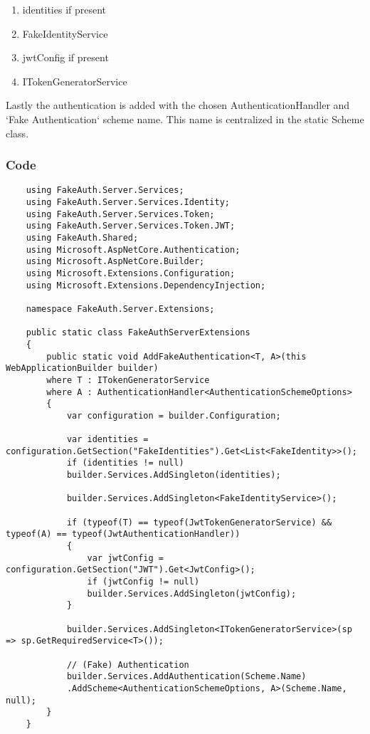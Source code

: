 \begin{enumerate}
    \item identities if present
    \item FakeIdentityService
    \item jwtConfig if present
    \item ITokenGeneratorService
\end{enumerate}

Lastly the authentication is added with the chosen AuthenticationHandler and `Fake Authentication` scheme name. This name is centralized in the static Scheme class.

\subsubsection{Code}

\begin{verbatim}
    using FakeAuth.Server.Services;
    using FakeAuth.Server.Services.Identity;
    using FakeAuth.Server.Services.Token;
    using FakeAuth.Server.Services.Token.JWT;
    using FakeAuth.Shared;
    using Microsoft.AspNetCore.Authentication;
    using Microsoft.AspNetCore.Builder;
    using Microsoft.Extensions.Configuration;
    using Microsoft.Extensions.DependencyInjection;
    
    namespace FakeAuth.Server.Extensions;
    
    public static class FakeAuthServerExtensions
    {
        public static void AddFakeAuthentication<T, A>(this WebApplicationBuilder builder)
        where T : ITokenGeneratorService
        where A : AuthenticationHandler<AuthenticationSchemeOptions>
        {
            var configuration = builder.Configuration;
            
            var identities = configuration.GetSection("FakeIdentities").Get<List<FakeIdentity>>();
            if (identities != null)
            builder.Services.AddSingleton(identities);
            
            builder.Services.AddSingleton<FakeIdentityService>();
            
            if (typeof(T) == typeof(JwtTokenGeneratorService) && typeof(A) == typeof(JwtAuthenticationHandler))
            {
                var jwtConfig = configuration.GetSection("JWT").Get<JwtConfig>();
                if (jwtConfig != null)
                builder.Services.AddSingleton(jwtConfig);
            }
            
            builder.Services.AddSingleton<ITokenGeneratorService>(sp => sp.GetRequiredService<T>());
            
            // (Fake) Authentication
            builder.Services.AddAuthentication(Scheme.Name)
            .AddScheme<AuthenticationSchemeOptions, A>(Scheme.Name, null);
        }
    }
\end{verbatim}

